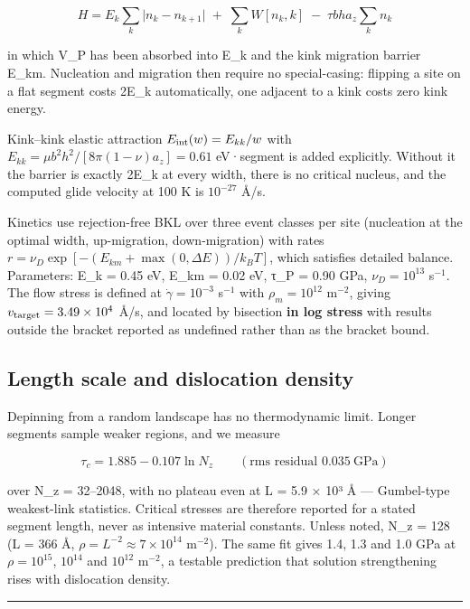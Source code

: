 \[\boxed{\;H = E_k\sum_k\bigl|n_k - n_{k+1}\bigr| \;+\; \sum_k W[n_k,k] \;-\; \tau b h a_z\sum_k n_k\;}\]

in which V\_P has been absorbed into E\_k and the kink migration barrier E\_km. Nucleation and migration then require no special-casing: flipping a site on a flat segment costs 2E\_k automatically, one adjacent to a kink costs zero kink energy.

Kink--kink elastic attraction \(E_{\rm int}(w) = E_{kk}/w\) with \(E_{kk} = \mu b^2h^2/[8\pi(1-\nu)a_z] = 0.61\) eV·segment is added explicitly. Without it the barrier is exactly 2E\_k at every width, there is no critical nucleus, and the computed glide velocity at 100 K is \(10^{-27}\) \AA/s.

Kinetics use rejection-free BKL over three event classes per site (nucleation at the optimal width, up-migration, down-migration) with rates \(r = \nu_D\exp[-(E_{km} + \max(0,\Delta E))/k_BT]\), which satisfies detailed balance. Parameters: E\_k = 0.45 eV, E\_km = 0.02 eV, τ\_P = 0.90 GPa, \(\nu_D = 10^{13}\) s\(^{-1}\). The flow stress is defined at \(\dot\gamma = 10^{-3}\) s\(^{-1}\) with \(\rho_m = 10^{12}\) m\(^{-2}\), giving \(v_{\rm target} = 3.49\times10^4\) \AA/s, and located by bisection \textbf{in log stress} with results outside the bracket reported as undefined rather than as the bracket bound.

\hypertarget{length-scale-and-dislocation-density}{%
\subsection{Length scale and dislocation density}\label{sec:length-scale-and-dislocation-density}}

Depinning from a random landscape has no thermodynamic limit. Longer segments sample weaker regions, and we measure

\[\tau_c = 1.885 - 0.107\ln N_z\qquad(\text{rms residual }0.035\ \text{GPa})\]

over N\_z = 32--2048, with no plateau even at L = 5.9 × 10³ Å --- Gumbel-type weakest-link statistics. Critical stresses are therefore reported for a stated segment length, never as intensive material constants. Unless noted, N\_z = 128 (L = 366 Å, \(\rho = L^{-2}\approx7\times10^{14}\) m\(^{-2}\)). The same fit gives 1.4, 1.3 and 1.0 GPa at \(\rho = 10^{15}\), \(10^{14}\) and \(10^{12}\) m\(^{-2}\), a testable prediction that solution strengthening rises with dislocation density.

\begin{center}\rule{0.5\linewidth}{0.5pt}\end{center}

